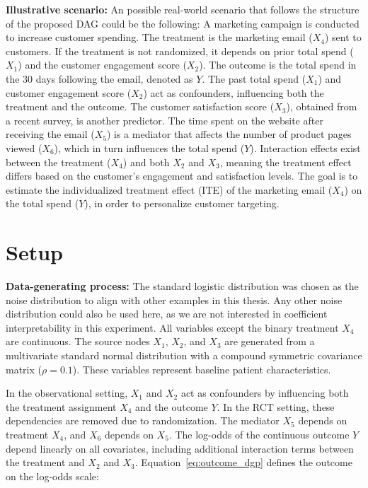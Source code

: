 \medskip

\textbf{Illustrative scenario:} An possible real-world scenario that follows the structure of the proposed DAG could be the following: A marketing campaign is conducted to increase customer spending. The treatment is the marketing email ($X_4$) sent to customers. If the treatment is not randomized, it depends on prior total spend ($X_1$) and the customer engagement score ($X_2$). The outcome is the total spend in the 30 days following the email, denoted as $Y$. The past total spend ($X_1$) and customer engagement score ($X_2$) act as confounders, influencing both the treatment and the outcome. The customer satisfaction score ($X_3$), obtained from a recent survey, is another predictor. The time spent on the website after receiving the email ($X_5$) is a mediator that affects the number of product pages viewed ($X_6$), which in turn influences the total spend ($Y$). Interaction effects exist between the treatment ($X_4$) and both $X_2$ and $X_3$, meaning the treatment effect differs based on the customer's engagement and satisfaction levels. The goal is to estimate the individualized treatment effect (ITE) of the marketing email ($X_4$) on the total spend ($Y$), in order to personalize customer targeting.

\medskip

\section{Setup} \label{sec:methods_experiment4}

\textbf{Data-generating process:} The standard logistic distribution was chosen as the noise distribution to align with other examples in this thesis. Any other noise distribution could also be used here, as we are not interested in coefficient interpretability in this experiment. All variables except the binary treatment $X_4$ are continuous. The source nodes $X_1$, $X_2$, and $X_3$ are generated from a multivariate standard normal distribution with a compound symmetric covariance matrix ($\rho = 0.1$). These variables represent baseline patient characteristics.

In the observational setting, $X_1$ and $X_2$ act as confounders by influencing both the treatment assignment $X_4$ and the outcome $Y$. In the RCT setting, these dependencies are removed due to randomization. The mediator $X_5$ depends on treatment $X_4$, and $X_6$ depends on $X_5$. The log-odds of the continuous outcome $Y$ depend linearly on all covariates, including additional interaction terms between the treatment and $X_2$ and $X_3$. Equation~\ref{eq:outcome_dgp} defines the outcome on the log-odds scale:

